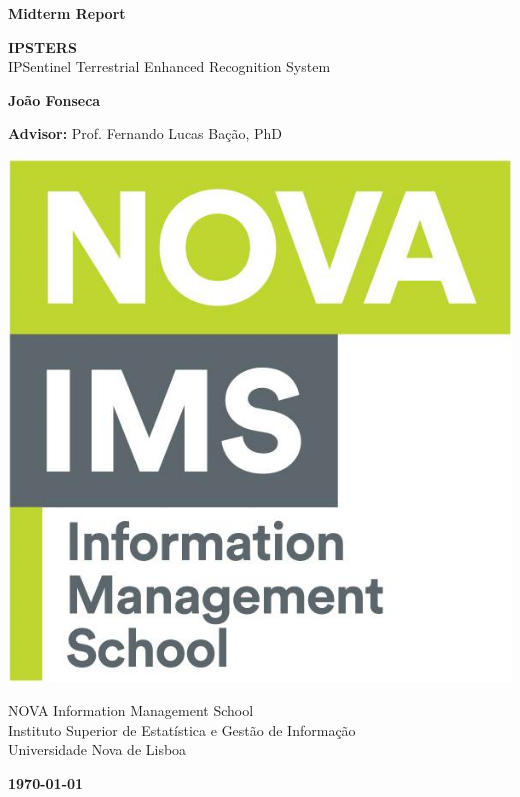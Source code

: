 \documentclass[12pt, english, openany]{book}
\begin{document}

\begin{titlepage}
	\clearpage\thispagestyle{empty}
	\centering
	\vspace{.5cm}

	{\large \textbf{Midterm Report} \par}
	\vspace{2.5cm}
	{\Huge \textbf{IPSTERS}} \\
  \vspace{1cm}
  {\Huge IPSentinel Terrestrial Enhanced Recognition System} \\
	\vspace{2.5cm}
	{\large \textbf{João Fonseca} \par}
	\vspace{.5cm}
	{\large \textbf{Advisor:} Prof. Fernando Lucas Bação, PhD \par}

	\vspace{1.5cm}
    \includegraphics[scale=0.2]{ims_logo.png}
  \vspace{1.3cm}

	{\normalsize NOVA Information Management School \\
		Instituto Superior de Estatística e Gestão de Informação \\
		Universidade Nova de Lisboa \par}

  \vspace{1.5cm}

	{\normalsize \textbf \today \par}
	\pagebreak
\end{titlepage}
\end{document}
